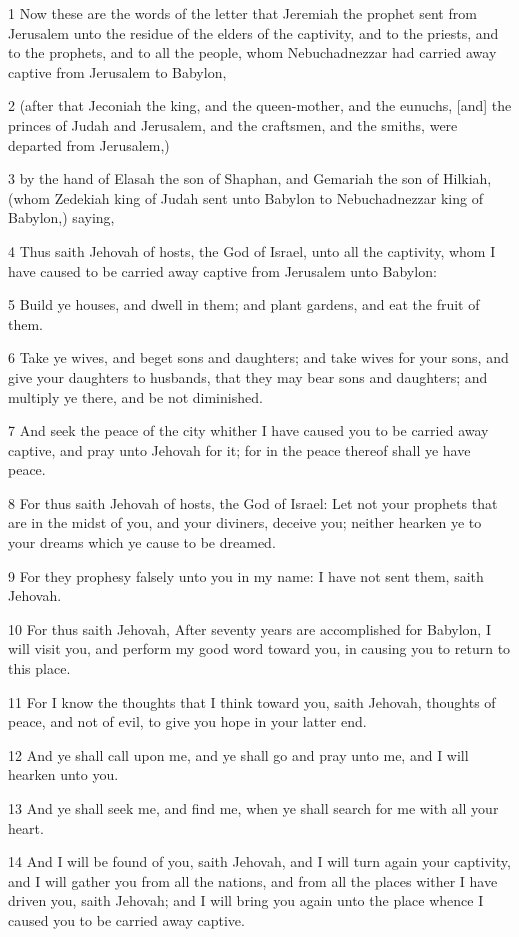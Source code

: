 \par 1 Now these are the words of the letter that Jeremiah the prophet sent from Jerusalem unto the residue of the elders of the captivity, and to the priests, and to the prophets, and to all the people, whom Nebuchadnezzar had carried away captive from Jerusalem to Babylon,
\par 2 (after that Jeconiah the king, and the queen-mother, and the eunuchs, [and] the princes of Judah and Jerusalem, and the craftsmen, and the smiths, were departed from Jerusalem,)
\par 3 by the hand of Elasah the son of Shaphan, and Gemariah the son of Hilkiah, (whom Zedekiah king of Judah sent unto Babylon to Nebuchadnezzar king of Babylon,) saying,
\par 4 Thus saith Jehovah of hosts, the God of Israel, unto all the captivity, whom I have caused to be carried away captive from Jerusalem unto Babylon:
\par 5 Build ye houses, and dwell in them; and plant gardens, and eat the fruit of them.
\par 6 Take ye wives, and beget sons and daughters; and take wives for your sons, and give your daughters to husbands, that they may bear sons and daughters; and multiply ye there, and be not diminished.
\par 7 And seek the peace of the city whither I have caused you to be carried away captive, and pray unto Jehovah for it; for in the peace thereof shall ye have peace.
\par 8 For thus saith Jehovah of hosts, the God of Israel: Let not your prophets that are in the midst of you, and your diviners, deceive you; neither hearken ye to your dreams which ye cause to be dreamed.
\par 9 For they prophesy falsely unto you in my name: I have not sent them, saith Jehovah.
\par 10 For thus saith Jehovah, After seventy years are accomplished for Babylon, I will visit you, and perform my good word toward you, in causing you to return to this place.
\par 11 For I know the thoughts that I think toward you, saith Jehovah, thoughts of peace, and not of evil, to give you hope in your latter end.
\par 12 And ye shall call upon me, and ye shall go and pray unto me, and I will hearken unto you.
\par 13 And ye shall seek me, and find me, when ye shall search for me with all your heart.
\par 14 And I will be found of you, saith Jehovah, and I will turn again your captivity, and I will gather you from all the nations, and from all the places wither I have driven you, saith Jehovah; and I will bring you again unto the place whence I caused you to be carried away captive.
